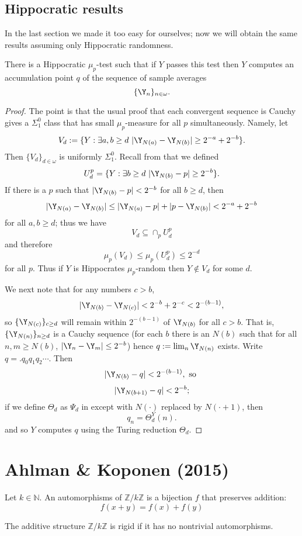\section{Hippocratic results}

In the last section we made it too easy for ourselves; now we will obtain the same results assuming only Hippocratic randomness. 

\begin{theorem}\label{Hippo}
There is a Hippocratic $\mu_p$-test such that if $Y$ passes this test then $Y$ computes an accumulation point $q$ of the sequence of sample averages 
\[
\{\Y_n\}_{n\in\omega}.
\] 
\end{theorem}

\begin{proof}
The point is that the usual proof that each convergent sequence is Cauchy gives a $\Sigma^0_1$ class that has small $\mu_p$-measure for all $p$ simultaneously. Namely, let
\[
V_d:=\{Y: \exists a,b\ge d\,\,|\Y_{N(a)}-\Y_{N(b)}|\ge 2^{-a}+ 2^{-b}\}.
\]
Then $\{V_d\}_{d\in\omega}$ is uniformly $\Sigma^0_1$. Recall from  that we defined
\[
U^{p}_d=\{Y:\exists b\ge d\,\, |\Y_{N(b)}-p|\ge 2^{-b}\}.
\]
If there is a $p$ such that $|\Y_{N(b)}-p|<2^{-b}$ for all $b\ge d$, then 
\[
|\Y_{N(a)}-\Y_{N(b)}|\le |\Y_{N(a)}-p|+|p-\Y_{N(b)}|< 2^{-a}+2^{-b}
\]
for all $a,b\ge d$; thus we have 
\[
V_d\subseteq \cap_{p} U^{p}_d
\]
and therefore 
\[
\mu_p(V_d)\le\mu_p(U^{p}_d)\le 2^{-d}
\]
for all $p$. 
 Thus if $Y$ is Hippocrates $\mu_p$-random then $Y\not\in V_d$ for some $d$. %

We next note that for any numbers $c> b$, 
\[
|\Y_{N(b)} - \Y_{N(c)}| < 2^{-b}+2^{-c} < 2^{-(b-1)},
\]
so $\{\Y_{N(c)}\}_{c\ge d}$ will remain within $2^{-(b-1)}$ of $\Y_{N(b)}$ for all $c>b$. That is, $\{\Y_{N(n)}\}_{n\ge d}$ is a Cauchy sequence (for each $b$ there is an $N(b)$ such that for all $n,m\ge N(b)$, $|\Y_n-\Y_m|\le 2^{-b}$) hence $q:=\lim_n \Y_{N(n)}$ exists. Write $q=.q_0q_1q_2\cdots$. Then
\[
|\Y_{N(b)}-q| <  2^{-(b-1)}, \text{ so }
\]
\[
|\Y_{N(b+1)}-q| <  2^{-b};
\]
if we define $\Theta_d$ as $\Psi_d$ in  except with $N(\cdot)$ replaced by $N(\cdot+1)$, then
\[
q_n = \Theta_d^Y(n).
\] 
and so $Y$ computes $q$ using the Turing reduction $\Theta_d$. 
\end{proof}



\chapter{Ahlman \& Koponen (2015)}
\begin{definition}
	\label{def:auto}
	\leanok
	Let $k\in\mathbb N$.
	An automorphisms of $\mathbb Z/ k\mathbb Z$ is a bijection $f$ that preserves addition:
	\[
	f(x+y)=f(x)+f(y)
	\]
\end{definition}
\begin{definition}
	\label{def:rigid}
	\leanok
	The additive structure $\mathbb Z/ k\mathbb Z$ is rigid if it has no nontrivial automorphisms.
\end{definition}


